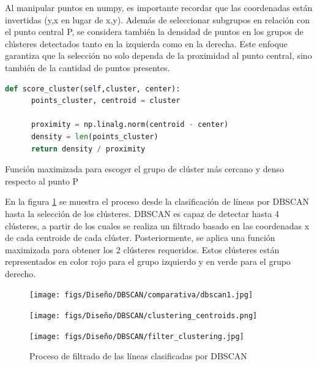 Al manipular puntos en numpy, es importante recordar que las coordenadas están invertidas (y,x en lugar de x,y). Además de seleccionar subgrupos en relación con el punto central P, 
se considera también la densidad de puntos en los grupos de clústeres detectados tanto en la izquierda como en la derecha. Este enfoque garantiza que la selección no solo dependa 
de la proximidad al punto central, sino también de la cantidad de puntos presentes.
\begin{code}[h]
  \begin{lstlisting}[language=Python]
    def score_cluster(self,cluster, center):
      points_cluster, centroid = cluster
    
      proximity = np.linalg.norm(centroid - center)
      density = len(points_cluster)
      return density / proximity

  \end{lstlisting}
  \caption[Función maximizada para escoger el grupo de cluster más cercano y denso respecto al punto P]{Función maximizada para escoger el grupo de clúster más cercano y denso respecto al punto P}
  \label{cod:funcion_maximizada}
  \vspace{-1.5em}
  \end{code}  
 
  En la figura \ref{fig:comparativa} se muestra el proceso desde la clasificación de líneas por DBSCAN hasta la selección de los clústeres. 
  DBSCAN es capaz de detectar hasta 4 clústeres, a partir de los cuales se realiza un filtrado basado en las coordenadas x de cada centroide de cada clúster. Posteriormente, 
  se aplica una función maximizada para obtener los 2 clústeres requeridos. Estos clústeres están representados en color rojo para el grupo izquierdo y en verde para el grupo 
  derecho. 
  \begin{figure}[H]
    \centering
    \begin{minipage}{0.3\textwidth}
      \texttt{[image: figs/Diseño/DBSCAN/comparativa/dbscan1.jpg]}
    \end{minipage}
    \hfill
    \begin{minipage}{0.3\textwidth}
      \texttt{[image: figs/Diseño/DBSCAN/clustering\_centroids.png]}
    \end{minipage}
    \hfill
    \begin{minipage}{0.3\textwidth}
      \texttt{[image: figs/Diseño/DBSCAN/filter\_clustering.jpg]}
    \end{minipage}
    \caption{Proceso de filtrado de las líneas clasificadas por DBSCAN}
    \label{fig:comparativa}
  \end{figure}

